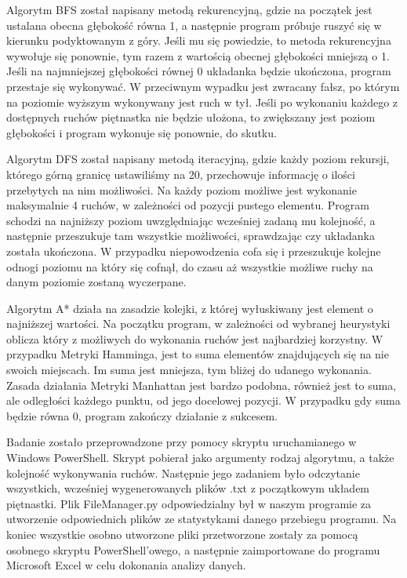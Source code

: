 \documentclass{classrep}
\begin{document}
{

Algorytm BFS został napisany metodą rekurencyjną, gdzie na początek jest ustalana obecna głębokość równa 1, a następnie program próbuje ruszyć się w kierunku podyktowanym z góry.
Jeśli mu się powiedzie, to metoda rekurencyjna wywołuje się ponownie, tym razem z wartością obecnej głębokości mniejszą o 1. Jeśli na najmniejszej głębokości równej 0 układanka będzie ukończona, program przestaje się wykonywać. W przeciwnym wypadku jest zwracany fałsz, po którym na poziomie wyższym wykonywany jest ruch w tył. Jeśli po wykonaniu każdego z dostępnych ruchów piętnastka nie będzie ułożona, to zwiększany jest poziom głębokości i program wykonuje się ponownie, do skutku.

Algorytm DFS został napisany metodą iteracyjną, gdzie każdy poziom rekursji, którego górną granicę ustawiliśmy na 20, przechowuje informację o ilości przebytych na nim możliwości. Na każdy poziom możliwe jest wykonanie maksymalnie 4 ruchów, w zależności od pozycji pustego elementu. Program schodzi na najniższy poziom uwzględniając wcześniej zadaną mu kolejność, a następnie przeszukuje tam wszystkie możliwości, sprawdzając czy układanka została ukończona. W przypadku niepowodzenia cofa się i przeszukuje kolejne odnogi poziomu na który się cofnął, do czasu aż wszystkie możliwe ruchy na danym poziomie zostaną wyczerpane.

Algorytm A* działa na zasadzie kolejki, z której wyłuskiwany jest element o najniższej wartości. Na początku program, w zależności od wybranej heurystyki oblicza który z możliwych do wykonania ruchów jest najbardziej korzystny. W przypadku Metryki Hamminga, jest to suma elementów znajdujących się na nie swoich miejscach. Im suma jest mniejsza, tym bliżej do udanego wykonania. Zasada działania Metryki Manhattan jest bardzo podobna, również jest to suma, ale odległości każdego punktu, od jego docelowej pozycji. W przypadku gdy suma będzie równa 0, program zakończy działanie z sukcesem.

Badanie zostało przeprowadzone przy pomocy skryptu uruchamianego w Windows PowerShell. Skrypt pobierał jako argumenty rodzaj algorytmu, a także kolejność wykonywania ruchów.
Następnie jego zadaniem było odczytanie wszystkich, wcześniej wygenerowanych plików .txt z początkowym układem piętnastki. Plik FileManager.py odpowiedzialny był w naszym programie za utworzenie odpowiednich plików ze statystykami danego przebiegu programu. Na koniec wszystkie osobno utworzone pliki przetworzone zostały za pomocą osobnego skryptu PowerShell'owego, a następnie zaimportowane do programu Microsoft Excel w celu dokonania analizy danych.
}
\end{document}

